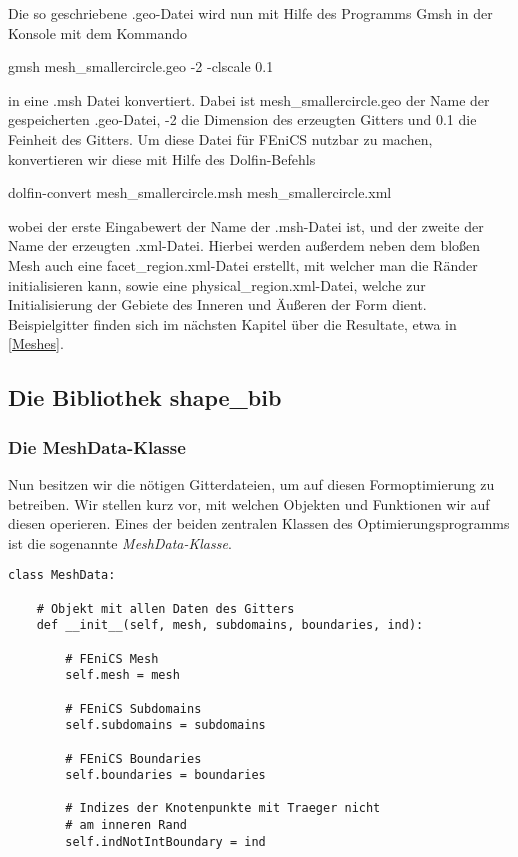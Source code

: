 Die so geschriebene \textsf{.geo}-Datei wird nun mit Hilfe des Programms \textsf{Gmsh} in der Konsole mit dem Kommando

\begin{center}
\textsf{gmsh mesh\_smallercircle.geo -2 -clscale 0.1}
\end{center}

in eine \textsf{.msh} Datei konvertiert. Dabei ist \textsf{mesh\_smallercircle.geo}
der Name der gespeicherten \textsf{.geo}-Datei, \textsf{-2} die Dimension des erzeugten Gitters und \textsf{0.1} die Feinheit des Gitters. Um diese Datei für FEniCS nutzbar zu machen, konvertieren wir diese mit Hilfe des Dolfin-Befehls

\begin{center}
\textsf{dolfin-convert mesh\_smallercircle.msh mesh\_smallercircle.xml}
\end{center}

wobei der erste Eingabewert der Name der \textsf{.msh}-Datei ist, und der zweite der Name der erzeugten \textsf{.xml}-Datei. Hierbei werden außerdem neben dem bloßen Mesh auch eine \textsf{facet\_region.xml}-Datei erstellt, mit welcher man die Ränder initialisieren kann, sowie eine \textsf{physical\_region.xml}-Datei, welche zur Initialisierung der Gebiete des Inneren und Äußeren der Form dient.
Beispielgitter finden sich im nächsten Kapitel über die Resultate, etwa in \ref{Meshes}.

\subsection{Die Bibliothek shape\_bib}
\subsubsection{Die MeshData-Klasse}
\label{meshdataclass}
Nun besitzen wir die nötigen Gitterdateien, um auf diesen Formoptimierung zu betreiben. Wir stellen kurz vor, mit welchen Objekten und Funktionen wir auf diesen operieren. Eines der beiden zentralen Klassen des Optimierungsprogramms ist die sogenannte \textit{MeshData-Klasse}. 

\begin{lstlisting}
class MeshData:

    # Objekt mit allen Daten des Gitters
    def __init__(self, mesh, subdomains, boundaries, ind):

        # FEniCS Mesh
        self.mesh = mesh

        # FEniCS Subdomains
        self.subdomains = subdomains

        # FEniCS Boundaries
        self.boundaries = boundaries

        # Indizes der Knotenpunkte mit Traeger nicht 
        # am inneren Rand
        self.indNotIntBoundary = ind
\end{lstlisting}

